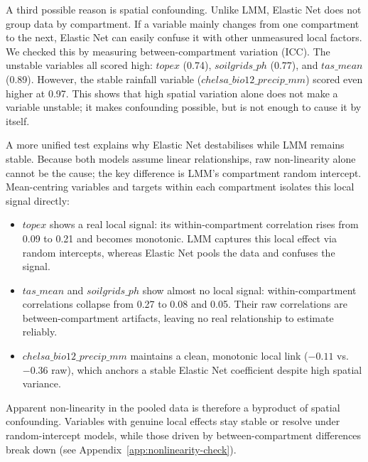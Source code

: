 \documentclass[logo,msc,ai]{infthesis}           %
\begin{document}
A third possible reason is spatial confounding. Unlike LMM, Elastic Net does not group data by compartment. If a variable mainly changes from one compartment to the next, Elastic Net can easily confuse it with other unmeasured local factors. We checked this by measuring between-compartment variation (ICC). The unstable variables all scored high: $\mathit{topex}$ (0.74), $\mathit{soilgrids\_ph}$ (0.77), and $\mathit{tas\_mean}$ (0.89). However, the stable rainfall variable ($\mathit{chelsa\_bio12\_precip\_mm}$) scored even higher at 0.97. This shows that high spatial variation alone does not make a variable unstable; it makes confounding possible, but is not enough to cause it by itself.

A more unified test explains why Elastic Net destabilises while LMM remains stable. Because both models assume linear relationships, raw non-linearity alone cannot be the cause; the key difference is LMM's compartment random intercept. Mean-centring variables and targets within each compartment isolates this local signal directly:

\begin{itemize}
    \item $\mathit{topex}$ shows a real local signal: its within-compartment correlation rises from 0.09 to 0.21 and becomes monotonic. LMM captures this local effect via random intercepts, whereas Elastic Net pools the data and confuses the signal.
    \item $\mathit{tas\_mean}$ and $\mathit{soilgrids\_ph}$ show almost no local signal: within-compartment correlations collapse from 0.27 to 0.08 and 0.05. Their raw correlations are between-compartment artifacts, leaving no real relationship to estimate reliably.
    \item $\mathit{chelsa\_bio12\_precip\_mm}$ maintains a clean, monotonic local link ($-0.11$ vs.\ $-0.36$ raw), which anchors a stable Elastic Net coefficient despite high spatial variance.
\end{itemize}

Apparent non-linearity in the pooled data is therefore a byproduct of spatial confounding. Variables with genuine local effects stay stable or resolve under random-intercept models, while those driven by between-compartment differences break down (see Appendix~\ref{app:nonlinearity-check}).
\end{document}
